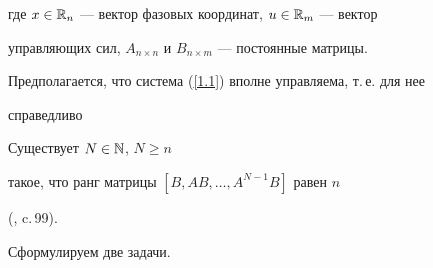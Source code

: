 где $x\in\Bbb{R}_n$ --- вектор фазовых координат, $u\in\Bbb{R}_m$ --- вектор


управляющих сил, $A_{n\times n}$ и $B_{n\times m}$ --- постоянные матрицы.


Предполагается, что система (\ref{1.1}) вполне управляема, т.\,е. для нее


справедливо





\begin{conds}


Существует $N\in\Bbb{N}$, $N\ge n$


такое, что ранг матрицы $[B, AB, \dotsc, A^{N-1}B]$ равен $n$


(\cite{1}, c.\,99).


\end{conds}





Сформулируем две задачи.






